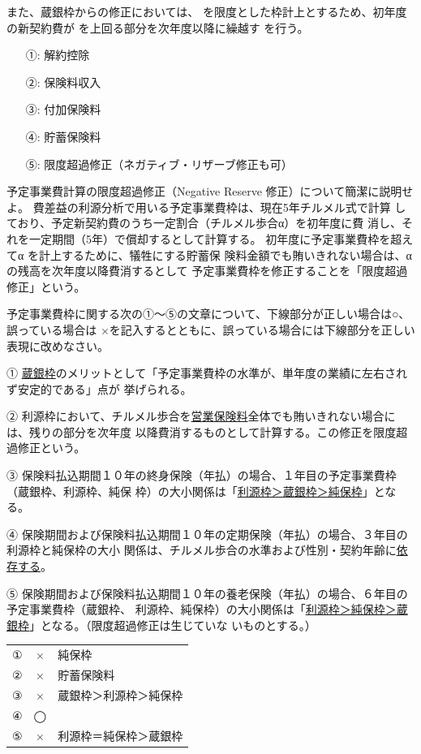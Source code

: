 \documentclass[report,gutter=10mm,fore-edge=10mm,uplatex,dvipdfmx]{jlreq}
\begin{document}
また、蔵銀枠からの修正においては、
を限度とした枠計上とするため、初年度の新契約費が
を上回る部分を次年度以降に繰越す
を行う。

\answer{}
\begin{itemize}
\item[ ①: ] 解約控除
\item[ ②: ] 保険料収入
\item[ ③: ] 付加保険料
\item[ ④: ] 貯蓄保険料
\item[ ⑤: ] 限度超過修正（ネガティブ・リザーブ修正も可）
\end{itemize}


予定事業費計算の限度超過修正（Negative Reserve 修正）について簡潔に説明せよ。
\answer{}
費差益の利源分析で用いる予定事業費枠は、現在5年チルメル式で計算
しており、予定新契約費のうち一定割合（チルメル歩合α）を初年度に費
消し、それを一定期間（5年）で償却するとして計算する。
初年度に予定事業費枠を超えてα
を計上するために、犠牲にする貯蓄保
険料金額でも賄いきれない場合は、α
の残高を次年度以降費消するとして
予定事業費枠を修正することを「限度超過修正」という。

予定事業費枠に関する次の①～⑤の文章について、下線部分が正しい場合は○、誤っている場合は
×を記入するとともに、誤っている場合には下線部分を正しい表現に改めなさい。

① \underline{蔵銀枠}のメリットとして「予定事業費枠の水準が、単年度の業績に左右されず安定的である」点が
挙げられる。

② 利源枠において、チルメル歩合を\underline{営業保険料}全体でも賄いきれない場合には、残りの部分を次年度
以降費消するものとして計算する。この修正を限度超過修正という。

③ 保険料払込期間１０年の終身保険（年払）の場合、１年目の予定事業費枠（蔵銀枠、利源枠、純保
枠）の大小関係は「\underline{利源枠＞蔵銀枠＞純保枠}」となる。

④ 保険期間および保険料払込期間１０年の定期保険（年払）の場合、３年目の利源枠と純保枠の大小
関係は、チルメル歩合の水準および性別・契約年齢に\underline{依存する}。

⑤ 保険期間および保険料払込期間１０年の養老保険（年払）の場合、６年目の予定事業費枠（蔵銀枠、
利源枠、純保枠）の大小関係は「\underline{利源枠＞純保枠＞蔵銀枠}」となる。（限度超過修正は生じていな
いものとする。）
\answer{}
\begin{tabular}{ccl}
 ①& ×& 純保枠\\
 ②& ×& 貯蓄保険料\\
 ③& ×& 蔵銀枠＞利源枠＞純保枠\\
 ④&◯ &\\
 ⑤& ×& 利源枠＝純保枠＞蔵銀枠\\
\end{tabular}
\end{document}
